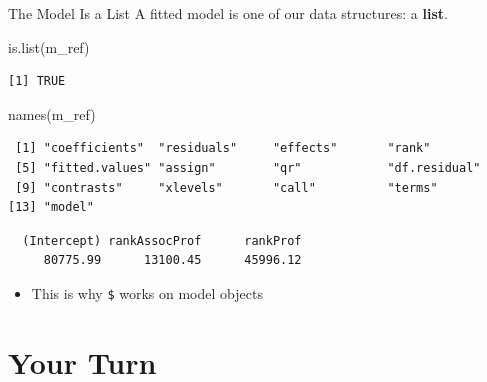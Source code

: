 \documentclass[
  ignorenonframetext,
  aspectratio=169,
]{beamer}
\newenvironment{Shaded}{\begin{snugshade}}{\end{snugshade}}
\newcommand{\FunctionTok}[1]{\textcolor[rgb]{0.28,0.35,0.67}{#1}}
\newcommand{\NormalTok}[1]{\textcolor[rgb]{0.00,0.23,0.31}{#1}}
\newcommand{\SpecialCharTok}[1]{\textcolor[rgb]{0.37,0.37,0.37}{#1}}
\providecommand{\tightlist}{%
  \setlength{\itemsep}{0pt}\setlength{\parskip}{0pt}}\usepackage{longtable,booktabs,array}
\begin{document}
\begin{frame}[fragile]{The Model Is a List}
\protect\hypertarget{the-model-is-a-list}{}
A fitted model is one of our data structures: a \textbf{list}.

\begin{Shaded}
\begin{Highlighting}[]
\FunctionTok{is.list}\NormalTok{(m\_ref)}
\end{Highlighting}
\end{Shaded}

\begin{verbatim}
[1] TRUE
\end{verbatim}

\begin{Shaded}
\begin{Highlighting}[]
\FunctionTok{names}\NormalTok{(m\_ref)}
\end{Highlighting}
\end{Shaded}

\begin{verbatim}
 [1] "coefficients"  "residuals"     "effects"       "rank"         
 [5] "fitted.values" "assign"        "qr"            "df.residual"  
 [9] "contrasts"     "xlevels"       "call"          "terms"        
[13] "model"        
\end{verbatim}

\begin{Shaded}
\end{Shaded}

\begin{verbatim}
  (Intercept) rankAssocProf      rankProf 
     80775.99      13100.45      45996.12 
\end{verbatim}

\begin{itemize}
\tightlist
\item
  This is why \texttt{\$} works on model objects
\end{itemize}
\end{frame}

\hypertarget{sec-your-turn}{%
\section{Your Turn}\label{sec-your-turn}}
\end{document}
